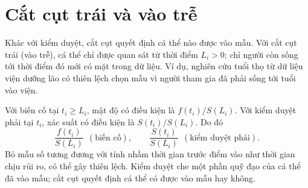 \documentclass[11pt,a4paper,notitlepage]{report}
\providecommand{\nguon}[1]{(nguồn: #1)}
\begin{document}




\section{Cắt cụt trái và vào trễ}\label{sec:cutcut}

Khác với kiểm duyệt, cắt cụt quyết định cá thể nào được vào mẫu. Với cắt cụt trái (vào trễ), cá
thể chỉ được quan sát từ thời điểm $L_i>0$; chỉ người còn sống tới thời điểm đó mới có mặt trong
dữ liệu. Ví dụ, nghiên cứu tuổi thọ từ dữ liệu viện dưỡng lão có thiên lệch chọn mẫu vì người tham
gia đã phải sống tới tuổi vào viện.

Với biến cố tại $t_i\ge L_i$, mật độ có điều kiện là $f(t_i)/S(L_i)$. Với kiểm duyệt phải tại $t_i$, xác suất có
điều kiện là $S(t_i)/S(L_i)$. Do đó
\begin{equation}\label{eq:trunc}
\frac{f(t_i)}{S(L_i)}\ \ (\text{biến cố}),\qquad\frac{S(t_i)}{S(L_i)}\ \ (\text{kiểm duyệt phải}).
\end{equation}
Bỏ mẫu số tương đương với tính nhầm thời gian trước điểm vào như thời gian chịu rủi ro, có thể
gây thiên lệch. Kiểm duyệt che một phần quỹ đạo của cá thể đã vào mẫu; cắt cụt quyết định cá
thể có được vào mẫu hay không.
\end{document}
